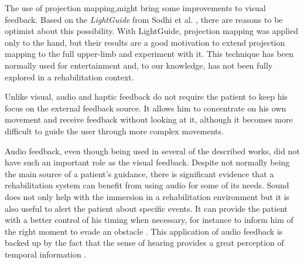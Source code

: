 The use of projection mapping,might bring some improvements to visual feedback. 
Based on the \textit{LightGuide} from Sodhi et al. \cite{Sodhi2012}, there are reasons to be optimist 
about this possibility. With LightGuide, projection mapping was applied only to the hand, but their results 
are a good motivation to extend projection mapping to the full upper-limb and experiment with it.
This technique has been normally used for entertainment and, to our knowledge, has not been fully explored 
in a rehabilitation context. 

Unlike visual, audio and haptic feedback do not require the patient to keep his focus on the external feedback source. 
It allows him to concentrate on his own movement and receive feedback without looking at it, although it becomes 
more difficult to guide the user through more complex movements.

Audio feedback, even though being used in several of the described works, did not have such an important role as the visual feedback. 
Despite not normally being the main source of a patient's guidance, there is significant evidence that a rehabilitation system 
can benefit from using audio for some of its needs.
Sound does not only help with the immersion in a rehabilitation environment but it is also useful to alert the patient about specific events. It 
can provide the patient with a better control of his timing when necessary, for instance to inform him 
of the right moment to evade an obstacle \cite{Wellner2007a}. This application of audio feedback is backed 
up by the fact that the sense of hearing provides a great perception of temporal information \cite{Sigrist2013}.

